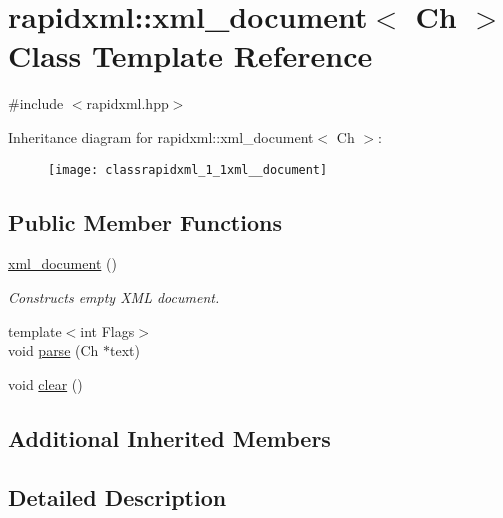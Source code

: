 \hypertarget{classrapidxml_1_1xml__document}{\section{rapidxml\-:\-:xml\-\_\-document$<$ Ch $>$ Class Template Reference}
\label{classrapidxml_1_1xml__document}
}


{\ttfamily \#include $<$rapidxml.\-hpp$>$}

Inheritance diagram for rapidxml\-:\-:xml\-\_\-document$<$ Ch $>$\-:\begin{figure}[H]
\begin{center}
\leavevmode
\texttt{[image: classrapidxml\_1\_1xml\_\_document]}
\end{center}
\end{figure}
\subsection*{Public Member Functions}
\begin{DoxyCompactItemize}
\item 
\hypertarget{classrapidxml_1_1xml__document_aae8841b15085ba8f32ff46587ace28f5}{\hyperlink{classrapidxml_1_1xml__document_aae8841b15085ba8f32ff46587ace28f5}{xml\-\_\-document} ()}\label{classrapidxml_1_1xml__document_aae8841b15085ba8f32ff46587ace28f5}

\begin{DoxyCompactList}\small\item\em Constructs empty X\-M\-L document. \end{DoxyCompactList}\item 
{\footnotesize template$<$int Flags$>$ }\\void \hyperlink{classrapidxml_1_1xml__document_ac6e73ff9ac323bf5a370c38feb03a6b1}{parse} (Ch $\ast$text)
\item 
void \hyperlink{classrapidxml_1_1xml__document_a826929ff54242532198701f19ff5f83f}{clear} ()
\end{DoxyCompactItemize}
\subsection*{Additional Inherited Members}


\subsection{Detailed Description}
